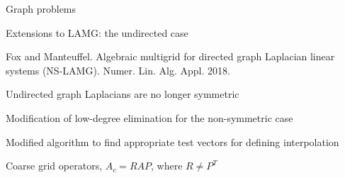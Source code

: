 \documentclass[18pt,xcolor=table]{beamer}
\begin{document}
\begin{frame}{Graph problems}
\begin{block}{Extensions to LAMG: the undirected case}
\bit
\item Fox and Manteuffel. Algebraic multigrid for directed graph Laplacian linear systems (NS-LAMG). Numer. Lin. Alg. Appl. 2018.
\item Undirected graph Laplacians are no longer symmetric
\item Modification of low-degree elimination for the non-symmetric case
\item Modified algorithm to find appropriate test vectors for defining interpolation
\item Coarse grid operators, $A_c = RAP$, where $R\neq P^T$
\eit
\end{block}
\end{frame}

\end{document}
